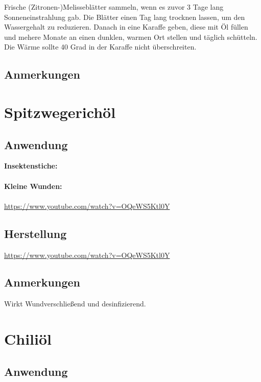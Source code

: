 Frische (Zitronen-)Melisseblätter sammeln, wenn es zuvor 3 Tage lang Sonneneinstrahlung gab. Die Blätter einen Tag lang trocknen lassen, um den Wassergehalt zu reduzieren. Danach in eine Karaffe geben, diese mit Öl füllen und mehere Monate an einen dunklen, warmen Ort stellen und täglich schütteln. Die Wärme sollte 40 Grad in der Karaffe nicht überschreiten.

\subsection{Anmerkungen}





\section{Spitzwegerichöl}

\subsection{Anwendung}

\textbf{Insektenstiche:} \\ \\
\textbf{Kleine Wunden:} \\ \\


\cite{swrhandwerkskunst} \url{https://www.youtube.com/watch?v=OQeWS5Ktl0Y}

\subsection{Herstellung}

\cite{swrhandwerkskunst} \url{https://www.youtube.com/watch?v=OQeWS5Ktl0Y}

\subsection{Anmerkungen}

Wirkt Wundverschließend und desinfizierend.



\section{Chiliöl}

\subsection{Anwendung}

